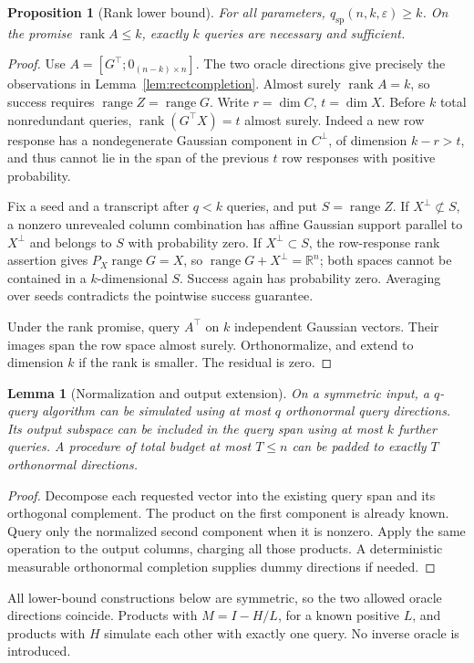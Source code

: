 \documentclass[11pt]{article}
\numberwithin{equation}{section}
\newtheorem{lemma}[theorem]{Lemma}
\newtheorem{proposition}[theorem]{Proposition}
\theoremstyle{remark}\newtheorem{remark}[theorem]{Remark}
\newcommand{\R}{\mathbb R}
\newcommand{\eps}{\varepsilon}
\newcommand{\qsp}{q_{\mathrm{sp}}}
\newcommand{\rank}{\operatorname{rank}}
\newcommand{\range}{\operatorname{range}}
\begin{document}
\begin{proposition}[Rank lower bound]\label{prop:rank}
For all parameters, $\qsp(n,k,\eps)\ge k$. On the promise $\rank A\le k$, exactly $k$ queries are necessary and sufficient.
\end{proposition}
\begin{proof}
Use $A=[G^\top;0_{(n-k)\times n}]$. The two oracle directions give precisely the observations in Lemma~\ref{lem:rectcompletion}. Almost surely $\rank A=k$, so success requires $\range Z=\range G$.
Write $r=\dim C$, $t=\dim X$. Before $k$ total nonredundant queries, $\rank(G^\top X)=t$ almost surely. Indeed a new row response has a nondegenerate Gaussian component in $C^\perp$, of dimension $k-r>t$, and thus cannot lie in the span of the previous $t$ row responses with positive probability.

Fix a seed and a transcript after $q<k$ queries, and put $S=\range Z$. If $X^\perp\not\subset S$, a nonzero unrevealed column combination has affine Gaussian support parallel to $X^\perp$ and belongs to $S$ with probability zero. If $X^\perp\subset S$, the row-response rank assertion gives $P_X\range G=X$, so $\range G+X^\perp=\R^n$; both spaces cannot be contained in a $k$-dimensional $S$. Success again has probability zero. Averaging over seeds contradicts the pointwise success guarantee.

Under the rank promise, query $A^\top$ on $k$ independent Gaussian vectors. Their images span the row space almost surely. Orthonormalize, and extend to dimension $k$ if the rank is smaller. The residual is zero.
\end{proof}

\begin{lemma}[Normalization and output extension]\label{lem:normalize}
On a symmetric input, a $q$-query algorithm can be simulated using at most $q$ orthonormal query directions. Its output subspace can be included in the query span using at most $k$ further queries. A procedure of total budget at most $T\le n$ can be padded to exactly $T$ orthonormal directions.
\end{lemma}
\begin{proof}
Decompose each requested vector into the existing query span and its orthogonal complement. The product on the first component is already known. Query only the normalized second component when it is nonzero. Apply the same operation to the output columns, charging all those products. A deterministic measurable orthonormal completion supplies dummy directions if needed.
\end{proof}
All lower-bound constructions below are symmetric, so the two allowed oracle directions coincide. Products with $M=I-H/L$, for a known positive $L$, and products with $H$ simulate each other with exactly one query. No inverse oracle is introduced.
\end{document}
